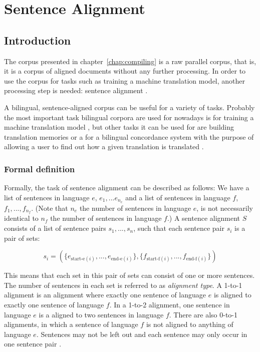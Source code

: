 \chapter{Sentence Alignment}\label{chap:sentence-alignment}
\section{Introduction}

The corpus presented in chapter~\ref{chap:compiling} is a raw parallel corpus, that is, it is a corpus of aligned documents without any further processing. 
In order to use the corpus for tasks such as training a machine translation model, another processing step is needed: sentence alignment \autocite[55]{koehn2009}.

A bilingual, sentence-aligned corpus can be useful for a variety of tasks. 
Probably the most important task bilingual corpora are used for nowadays is for training a machine translation model \autocites{gale-church-1991-program,moore2002fast,chen-1993-aligning}, but other tasks it can be used for are building translation memories \autocite{sennrich-volk-2011-iterative} or a for a bilingual concordance system with the purpose of allowing a user to find out how a given translation is translated \autocites{moore2002fast,gale-church-1991-program}.

\subsection{Formal definition}
Formally, the task of sentence alignment can be described as follows: We have a list of sentences in language \(e\), \(e_1,...e_{n_e}\) and a list of sentences in language \(f\), \(f_1,...,f_{n_f}\). 
(Note that \(n_e\) the number of sentences in language $e$, is not necessarily identical to \(n_f\) the number of sentences in language \(f\).) 
A sentence alignment \(S\) consists of a list of sentence pairs \(s_1, ..., s_n\), such that each sentence pair \(s_i\) is a pair of sets:

\[
	s_i = ( \{ e_{\text{start-e}(i)},... , e_{\text{end-e}(i)}\}, \{f_{\text{start-f}(i)},... , f_{\text{end-f}(i)}\} )
\]
\autocite[56]{koehn2009}

This means that each set in this pair of sets can consist of one or more sentences. 
The number of sentences in each set is referred to as \emph{alignment type}. 
A 1-to-1 alignment is an alignment where exactly one sentence of language \(e\)
is aligned to exactly one sentence of language \(f\). 
In a 1-to-2 alignment, one sentence in language \(e\) is a aligned to two sentences in language \(f\). 
There are also 0-to-1 alignments, in which a sentence of language \(f\) is not aligned to anything of language \(e\). 
Sentences may not be left out and each sentence may only occur in one sentence pair \autocite[57]{koehn2009}. 


